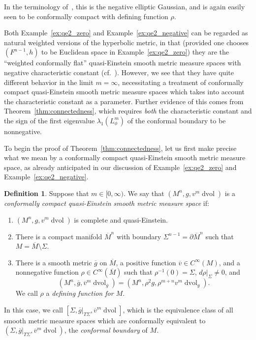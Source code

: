\documentclass{amsart}
\theoremstyle{definition}
\newtheorem{defn}[thm]{Definition}
\theoremstyle{remark}
\numberwithin{equation}{section}
\begin{document}
In the terminology of~\cite{Case2010a,HePetersenWylie2010}, this is the negative elliptic Gaussian, and is again easily seen to be conformally compact with defining function $\rho$.

Both Example~\ref{ex:qe2_zero} and Example~\ref{ex:qe2_negative} can be regarded as natural weighted versions of the hyperbolic metric, in that (provided one chooses $(F^{n-1},h)$ to be Euclidean space in Example~\ref{ex:qe2_zero}) they are the ``weighted conformally flat'' quasi-Einstein smooth metric measure spaces with negative characteristic constant (cf.\ \cite{Case2011t,HePetersenWylie2011c}).  However, we see that they have quite different behavior in the limit $m=\infty$, necessitating a treatment of conformally compact quasi-Einstein smooth metric measure spaces which takes into account the characteristic constant as a parameter.  Further evidence of this comes from Theorem~\ref{thm:connectedness}, which requires \emph{both} the characteristic constant and the sign of the first eigenvalue $\lambda_1(L_\phi^m)$ of the conformal boundary to be nonnegative.

To begin the proof of Theorem~\ref{thm:connectedness}, let us first make precise what we mean by a conformally compact quasi-Einstein smooth metric measure space, as already anticipated in our discussion of Example~\ref{ex:qe2_zero} and Example~\ref{ex:qe2_negative}.

\begin{defn}
\label{defn:ccqe}
Suppose that $m\in[0,\infty)$.  We say that $(M^n,g,v^m\operatorname{dvol})$ is a \emph{conformally compact quasi-Einstein smooth metric measure space} if:
\begin{enumerate}
\item $(M^n,g,v^m\operatorname{dvol})$ is complete and quasi-Einstein.
\item There is a compact manifold $\overline{M}^n$ with boundary $\Sigma^{n-1}=\partial\overline{M}^n$ such that $M=\overline{M}\setminus\Sigma$.
\item There is a smooth metric ${\overline{g}}$ on $\overline{M}$, a positive function ${\overline{v}}\in C^\infty(M)$, and a nonnegative function $\rho\in C^\infty(\overline{M})$ such that $\rho^{-1}(0)=\Sigma$, $d\rho{\rvert}_\Sigma\not=0$, and
\[ \left( M^n, {\overline{g}}, {\overline{v}}^m\operatorname{dvol}_{\overline{g}} \right) = \left( M^n, \rho^2g, \rho^{m+n}v^m\operatorname{dvol}_g \right) . \]
We call $\rho$ a \emph{defining function for $M$}.
\end{enumerate}

In this case, we call $[\Sigma,{\overline{g}}{\rvert}_{T\Sigma},{\overline{v}}^m\operatorname{dvol}]$, which is the equivalence class of all smooth metric measure spaces which are conformally equivalent to $(\Sigma,{\overline{g}}{\rvert}_{T\Sigma},{\overline{v}}^m\operatorname{dvol})$, the \emph{conformal boundary} of $M$.
\end{defn}
\end{document}
